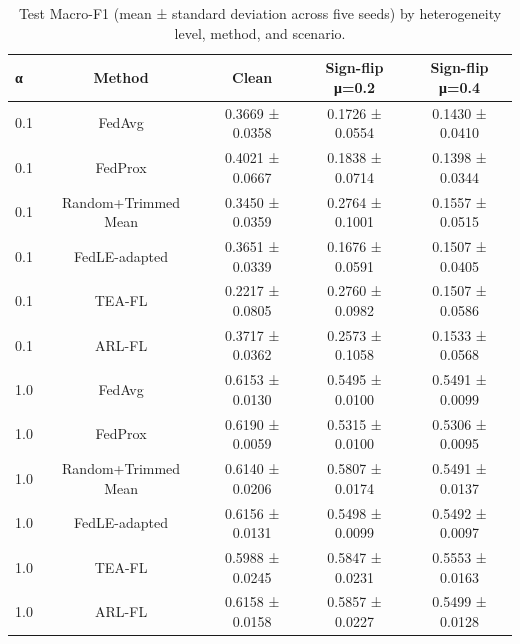 \begin{table}[t]
\centering
\caption{Test Macro-F1 (mean ± standard deviation across five seeds) by heterogeneity level, method, and scenario.}
\label{tab:ciciot\_macro\_f1}
\begin{tabular}{lcccc}
\toprule
α & Method & Clean & Sign-flip μ=0.2 & Sign-flip μ=0.4 \\
\midrule
0.1 & FedAvg & 0.3669 ± 0.0358 & 0.1726 ± 0.0554 & 0.1430 ± 0.0410 \\
0.1 & FedProx & 0.4021 ± 0.0667 & 0.1838 ± 0.0714 & 0.1398 ± 0.0344 \\
0.1 & Random+Trimmed Mean & 0.3450 ± 0.0359 & 0.2764 ± 0.1001 & 0.1557 ± 0.0515 \\
0.1 & FedLE-adapted & 0.3651 ± 0.0339 & 0.1676 ± 0.0591 & 0.1507 ± 0.0405 \\
0.1 & TEA-FL & 0.2217 ± 0.0805 & 0.2760 ± 0.0982 & 0.1507 ± 0.0586 \\
0.1 & ARL-FL & 0.3717 ± 0.0362 & 0.2573 ± 0.1058 & 0.1533 ± 0.0568 \\
1.0 & FedAvg & 0.6153 ± 0.0130 & 0.5495 ± 0.0100 & 0.5491 ± 0.0099 \\
1.0 & FedProx & 0.6190 ± 0.0059 & 0.5315 ± 0.0100 & 0.5306 ± 0.0095 \\
1.0 & Random+Trimmed Mean & 0.6140 ± 0.0206 & 0.5807 ± 0.0174 & 0.5491 ± 0.0137 \\
1.0 & FedLE-adapted & 0.6156 ± 0.0131 & 0.5498 ± 0.0099 & 0.5492 ± 0.0097 \\
1.0 & TEA-FL & 0.5988 ± 0.0245 & 0.5847 ± 0.0231 & 0.5553 ± 0.0163 \\
1.0 & ARL-FL & 0.6158 ± 0.0158 & 0.5857 ± 0.0227 & 0.5499 ± 0.0128 \\
\bottomrule
\end{tabular}
\end{table}
